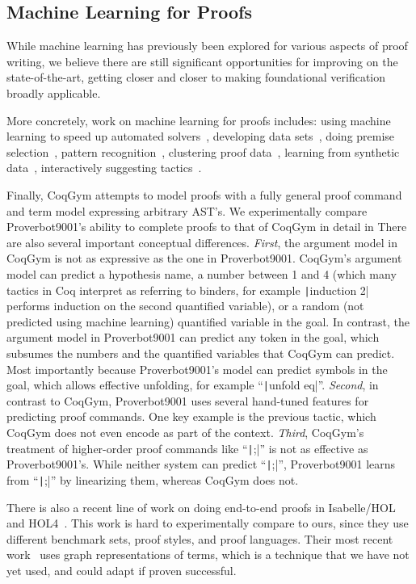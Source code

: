 \documentclass[sigplan,screen]{acmart}
\newcommand{\name}{Proverbot9001\xspace}
\newcommand{\coqinline}[1]{\texttt|#1|}
\renewcommand{\>}{\quad}
\begin{document}
\subsection{Machine Learning for Proofs}
While machine learning has previously been explored for various aspects of proof
writing, we believe there are still significant opportunities for improving on
the state-of-the-art, getting closer and closer to making foundational verification
broadly applicable.

More concretely, work on machine learning for
proofs includes: using machine learning to speed up automated solvers~\cite{learning-to-solve},
developing data sets~\cite{holstep, coqgym, holist}, doing
premise selection~\cite{premise1, premise2}, pattern
recognition~\cite{deep-features}, clustering proof data~\cite{ml4pg}, learning
from synthetic data~\cite{gamepad}, interactively suggesting
tactics~\cite{ml4pg, acl2ml}.

Finally, CoqGym attempts to model proofs
  with a fully general proof command and term model expressing arbitrary AST's.
We experimentally compare \name{}'s ability to complete proofs to that of CoqGym
  in detail in 
There are also several important conceptual differences.
\emph{First}, the argument model in CoqGym is not as expressive as the one in \name{}.
CoqGym's argument model can predict a hypothesis name, a number between 1 and 4 (which many tactics in Coq interpret as referring to binders, for example \coqinline{induction 2} performs induction on the second quantified variable), or a random (not predicted using machine learning) quantified variable in the goal.
In contrast, the argument model in \name{} can predict any token in the goal, which subsumes the numbers and the quantified variables that CoqGym can predict.
Most importantly because \name{}'s model can predict symbols in the goal, which allows effective unfolding, for example ``\coqinline{unfold eq}''.
\emph{Second}, in contrast to CoqGym, \name{} uses several hand-tuned features for predicting proof commands.
One key example is the previous tactic, which CoqGym does not even encode as part of the context.
\emph{Third}, CoqGym's treatment of higher-order proof commands like ``\coqinline{;}'' is not as effective as \name{}'s.
While neither system can predict ``\coqinline{;}'', \name{} learns from ``\coqinline{;}'' by linearizing them, whereas CoqGym does not.



There is also a recent line of work on doing end-to-end proofs in Isabelle/HOL and
HOL4~\cite{tactictoe,holist,graph-holist}. This work is hard to experimentally
compare to ours, since they use different benchmark sets, proof styles, and
proof languages. Their most recent work~\cite{graph-holist} uses graph
representations of terms, which is a technique that we have not yet used, and
could adapt if proven successful.
\end{document}
